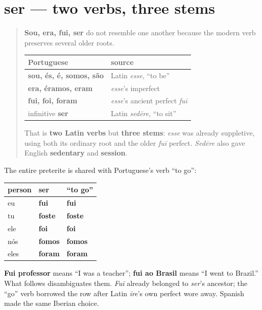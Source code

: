\section[sou / era / fui / ser]{ser — two verbs, three stems}

\label{lesson:PT-C16-ser-roots}



\begin{quote}
\textbf{Sou, era, fui, ser} do not resemble one another because the modern verb preserves several older roots.

\noindent
\begin{tabularx}{\linewidth}{@{}>{\raggedright\arraybackslash}X>{\raggedright\arraybackslash}X@{}}
\toprule
\textbf{Portuguese} & \textbf{source} \\
\midrule
\textbf{sou, és, é, somos, são} & Latin \emph{esse}, “to be” \\
\textbf{era, éramos, eram} & \emph{esse}’s imperfect \\
\textbf{fui, foi, foram} & \emph{esse}’s ancient perfect \emph{fuī} \\
infinitive \textbf{ser} & Latin \emph{sedēre}, “to sit” \\
\bottomrule
\end{tabularx}

That is \textbf{two Latin verbs} but \textbf{three stems}: \emph{esse} was already suppletive, using both its ordinary root and the older \emph{fuī} perfect. \emph{Sedēre} also gave English \textbf{sedentary} and \textbf{session}.
\end{quote}

\begin{cousinweb}
The entire preterite is shared with Portuguese’s verb “to go”:

\noindent
\begin{tabularx}{\linewidth}{@{}>{\raggedright\arraybackslash}X>{\raggedright\arraybackslash}X>{\raggedright\arraybackslash}X@{}}
\toprule
\textbf{person} & \textbf{ser} & \textbf{“to go”} \\
\midrule
eu & \textbf{fui} & \textbf{fui} \\
tu & \textbf{foste} & \textbf{foste} \\
ele & \textbf{foi} & \textbf{foi} \\
nós & \textbf{fomos} & \textbf{fomos} \\
eles & \textbf{foram} & \textbf{foram} \\
\bottomrule
\end{tabularx}

\textbf{Fui professor} means “I was a teacher”; \textbf{fui ao Brasil} means “I went to Brazil.” What follows disambiguates them. \emph{Fuī} already belonged to \emph{ser}’s ancestor; the “go” verb borrowed the row after Latin \emph{īre}’s own perfect wore away. Spanish made the same Iberian choice.
\end{cousinweb}

